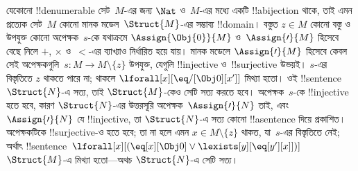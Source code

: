 \documentclass[../../../include/open-logic-section]{subfiles}
\begin{document}
\begin{explain}
যেকোনো !!{denumerable} সেট~$M$-এর জন্য $\Nat$ ও~$M$-এর মধ্যে একটি
!!a{bijection} থাকে, তাই এমন প্রত্যেক সেট~$M$ কোনো মানক
মডেল~$\Struct{M}$-এর সম্ভাব্য
!!{domain}। বস্তুত $z \in M$ কোনো বস্তু ও উপযুক্ত কোনো অপেক্ষক~$s$-কে
যথাক্রমে $\Assign{\Obj{0}}{M}$ ও~$\Assign{\prime}{M}$ হিসেবে বেছে
নিলে $+$, $\times$ ও~$<$-এর ব্যাখ্যাও নির্ধারিত হয়ে যায়। মানক মডেলে
$\Assign{\prime}{M}$ হিসেবে কেবল সেই অপেক্ষকগুলি~$s\colon M \to M
\setminus \{z\}$ উপযুক্ত, যেগুলি !!{injective} ও~!!{surjective} উভয়ই।
$s$-এর বিস্তৃতিতে $z$ থাকতে পারে না; থাকলে
$\lforall[x][\eq/[\Obj 0][x']]$ মিথ্যা হতো। ওই !!{sentence}
$\Struct{N}$-এ সত্য,
তাই $\Struct{M}$-কেও সেটি সত্য করতে হবে। অপেক্ষক~$s$-কে !!{injective}
হতে হবে, কারণ $\Struct{N}$-এর উত্তরসূরি অপেক্ষক~$\Assign{\prime}{N}$
তাই, এবং $\Assign{\prime}{N}$ যে !!{injective}, তা $\Struct{N}$-এ সত্য
কোনো !!a{sentence} দিয়ে প্রকাশিত। অপেক্ষকটিকে !!{surjective}-ও হতে হবে;
তা না হলে এমন $x \in M \setminus \{z\}$ থাকত, যা~$s$-এর বিস্তৃতিতে নেই;
অর্থাৎ !!{sentence}~$\lforall[x][(\eq[x][\Obj 0] \lor
\lexists[y][\eq[y'][x]])]$ $\Struct{M}$-এ মিথ্যা হতো---অথচ
$\Struct{N}$-এ সেটি সত্য।
\end{explain}
\end{document}
